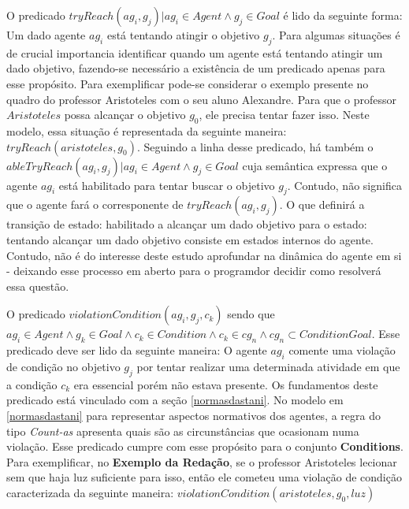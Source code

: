 O predicado $tryReach(ag_i,g_j) | ag_i \in Agent \wedge g_j \in Goal $ é lido da seguinte forma: Um dado agente $ag_i$ está tentando 
atingir o objetivo $g_j$. Para algumas situações é de crucial importancia identificar quando um agente está tentando atingir um 
dado objetivo, fazendo-se necessário a existência de um predicado apenas para esse propósito. Para exemplificar pode-se considerar 
o exemplo presente no quadro do professor Aristoteles com o seu aluno Alexandre. Para que o professor $Aristoteles$ possa alcançar 
o objetivo $g_0$, ele precisa tentar fazer isso. Neste modelo, essa situação é representada da seguinte maneira: $tryReach(aristoteles,g_0)$.
Seguindo a linha desse predicado, há também o $ableTryReach(ag_i,g_j) | ag_i \in Agent \wedge g_j \in Goal$ cuja semântica expressa que o agente $ag_i$ está habilitado para tentar 
buscar o objetivo $g_j$. Contudo, não significa que o agente fará o corresponente de $tryReach(ag_i,g_j)$. O que definirá a transição de estado:
habilitado a alcançar um dado objetivo para o estado: tentando alcançar um dado objetivo consiste em estados internos do agente. Contudo, não é 
do interesse deste estudo aprofundar na dinâmica do agente em si - deixando esse processo em aberto para o programdor decidir como resolverá essa questão.

O predicado $ violationCondition(ag_i,g_j,c_k) $ sendo que 
$ ag_i \in Agent \wedge g_k \in Goal \wedge c_k \in Condition \wedge c_k  \in cg_n \wedge cg_n \subset ConditionGoal $. Esse predicado
deve ser lido da seguinte maneira: O agente $ag_i$ comente uma violação de condição no objetivo $g_j$ por tentar realizar uma determinada
atividade em que a condição $c_k$ era essencial porém não estava presente. Os fundamentos deste predicado está vinculado com a seção \ref{normasdastani}.
No modelo em \ref{normasdastani} para representar aspectos normativos dos agentes, a regra do tipo \textit{Count-as} apresenta 
quais são as circunstâncias que ocasionam numa violação. Esse predicado cumpre com esse propósito para o conjunto \textbf{Conditions}. 
Para exemplificar, no \textbf{Exemplo da Redação}, se o professor Aristoteles lecionar sem que haja luz suficiente para isso, 
então ele cometeu uma violação de condição caracterizada da seguinte maneira: $violationCondition(aristoteles,g_0,luz)$

